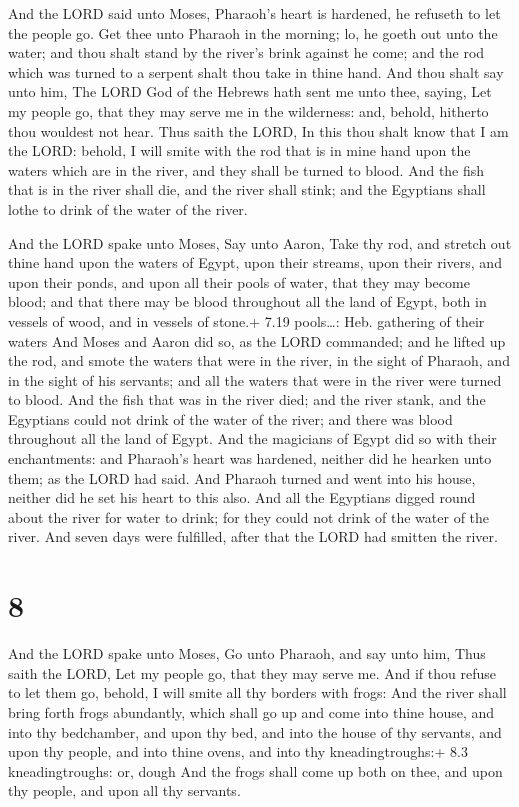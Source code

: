  And the LORD said unto Moses, Pharaoh's heart is
hardened, he refuseth to let the people go.  Get thee unto
Pharaoh in the morning; lo, he goeth out unto the water; and thou shalt
stand by the river's brink against he come; and the rod which was turned
to a serpent shalt thou take in thine hand.  And thou shalt
say unto him, The LORD God of the Hebrews hath sent me unto thee,
saying, Let my people go, that they may serve me in the wilderness: and,
behold, hitherto thou wouldest not hear.  Thus saith the
LORD, In this thou shalt know that I am the LORD: behold, I will smite
with the rod that is in mine hand upon the waters which are in the
river, and they shall be turned to blood.  And the fish
that is in the river shall die, and the river shall stink; and the
Egyptians shall lothe to drink of the water of the river.

 And the LORD spake unto Moses, Say unto Aaron, Take thy
rod, and stretch out thine hand upon the waters of Egypt, upon their
streams, upon their rivers, and upon their ponds, and upon all their
pools of water, that they may become blood; and that there may be blood
throughout all the land of Egypt, both in vessels of wood, and in
vessels of stone.+ 7.19 pools\ldots: Heb. gathering of their waters
 And Moses and Aaron did so, as the LORD commanded; and he
lifted up the rod, and smote the waters that were in the river, in the
sight of Pharaoh, and in the sight of his servants; and all the waters
that were in the river were turned to blood.  And the fish
that was in the river died; and the river stank, and the Egyptians could
not drink of the water of the river; and there was blood throughout all
the land of Egypt.  And the magicians of Egypt did so with
their enchantments: and Pharaoh's heart was hardened, neither did he
hearken unto them; as the LORD had said.  And Pharaoh
turned and went into his house, neither did he set his heart to this
also.  And all the Egyptians digged round about the river
for water to drink; for they could not drink of the water of the river.
 And seven days were fulfilled, after that the LORD had
smitten the river.

\hypertarget{section-7}{%
\section{8}\label{section-7}}

 And the LORD spake unto Moses, Go unto Pharaoh, and say
unto him, Thus saith the LORD, Let my people go, that they may serve me.
 And if thou refuse to let them go, behold, I will smite all
thy borders with frogs:  And the river shall bring forth
frogs abundantly, which shall go up and come into thine house, and into
thy bedchamber, and upon thy bed, and into the house of thy servants,
and upon thy people, and into thine ovens, and into thy
kneadingtroughs:+ 8.3 kneadingtroughs: or, dough  And the
frogs shall come up both on thee, and upon thy people, and upon all thy
servants.

